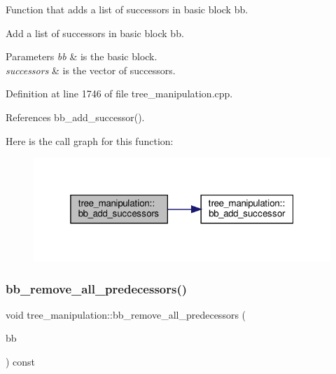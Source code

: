 Function that adds a list of successors in basic block bb. 

Add a list of successors in basic block bb.


\begin{DoxyParams}{Parameters}
{\em bb} & is the basic block. \\
\hline
{\em successors} & is the vector of successors. \\
\hline
\end{DoxyParams}


Definition at line 1746 of file tree\+\_\+manipulation.\+cpp.



References bb\+\_\+add\+\_\+successor().

Here is the call graph for this function\+:
\nopagebreak
\begin{figure}[H]
\begin{center}
\leavevmode
\includegraphics[width=319pt]{d0/d99/classtree__manipulation_a089337a8687af25c855ac7fa0413a628_cgraph}
\end{center}
\end{figure}
\mbox{\label{classtree__manipulation_a15048a714efe6ef894d80f193766bcf9}} 
\subsubsection{\texorpdfstring{bb\+\_\+remove\+\_\+all\+\_\+predecessors()}{bb\_remove\_all\_predecessors()}}
{\footnotesize\ttfamily void tree\+\_\+manipulation\+::bb\+\_\+remove\+\_\+all\+\_\+predecessors (\begin{DoxyParamCaption}\item[{bloc\+Ref \&}]{bb }\end{DoxyParamCaption}) const}



